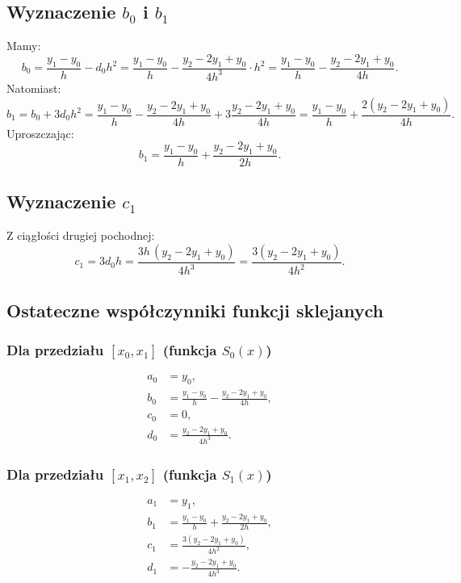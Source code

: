 \documentclass{article}
\begin{document}
\subsection{Wyznaczenie \(b_0\) i \(b_1\)}
Mamy:
\[
b_0=\frac{y_1-y_0}{h}-d_0h^2=\frac{y_1-y_0}{h}-\frac{y_2-2y_1+y_0}{4h^3}\cdot h^2
=\frac{y_1-y_0}{h}-\frac{y_2-2y_1+y_0}{4h}.
\]
Natomiast:
\[
b_1=b_0+3d_0h^2=\frac{y_1-y_0}{h}-\frac{y_2-2y_1+y_0}{4h}+3\frac{y_2-2y_1+y_0}{4h}
=\frac{y_1-y_0}{h}+\frac{2(y_2-2y_1+y_0)}{4h}.
\]
Uproszczając:
\[
b_1=\frac{y_1-y_0}{h}+\frac{y_2-2y_1+y_0}{2h}.
\]

\subsection{Wyznaczenie \(c_1\)}
Z ciągłości drugiej pochodnej:
\[
c_1=3d_0h=\frac{3h\,(y_2-2y_1+y_0)}{4h^3}=\frac{3(y_2-2y_1+y_0)}{4h^2}.
\]

\subsection{Ostateczne współczynniki funkcji sklejanych}
\subsubsection*{Dla przedziału \([x_0,x_1]\) (funkcja \(S_0(x)\))}
\[
\begin{aligned}
a_0 &= y_0,\\[1mm]
b_0 &= \frac{y_1-y_0}{h}-\frac{y_2-2y_1+y_0}{4h},\\[1mm]
c_0 &= 0,\\[1mm]
d_0 &= \frac{y_2-2y_1+y_0}{4h^3}.
\end{aligned}
\]

\subsubsection*{Dla przedziału \([x_1,x_2]\) (funkcja \(S_1(x)\))}
\[
\begin{aligned}
a_1 &= y_1,\\[1mm]
b_1 &= \frac{y_1-y_0}{h}+\frac{y_2-2y_1+y_0}{2h},\\[1mm]
c_1 &= \frac{3(y_2-2y_1+y_0)}{4h^2},\\[1mm]
d_1 &= -\frac{y_2-2y_1+y_0}{4h^3}.
\end{aligned}
\]
\end{document}
